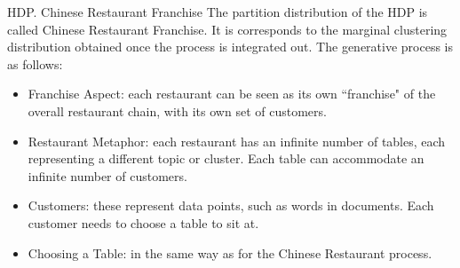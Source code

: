 \begin{frame}{HDP. Chinese Restaurant Franchise}
The partition distribution of the HDP is called \alert{Chinese Restaurant Franchise}. It is corresponds to the marginal clustering distribution obtained once the process is integrated out. The \alert{generative process} is as follows:
\begin{itemize}
	\item \alert{Franchise Aspect}: each restaurant can be seen as its own ``franchise" of the overall restaurant chain, with its own set of customers.
	\item \alert{Restaurant Metaphor}: each restaurant has an infinite number of tables, each representing a different topic or cluster. Each table can accommodate an infinite number of customers.
	\item \alert{Customers}: these represent data points, such as words in documents. Each customer needs to choose a table to sit at.
	\item \alert{Choosing a Table}: in the same way as for the Chinese Restaurant process.
\end{itemize}
\end{frame}

